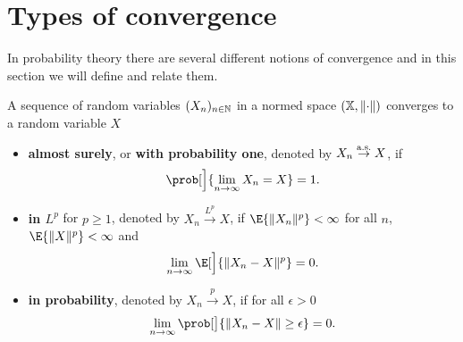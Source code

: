 \section{Types of convergence}

In probability theory there are several different notions of convergence and in
this section we will define and relate them.

\begin{mdframed}[innertopmargin=0pt]
\begin{definition}
    \label{def: types of convergence}
    A sequence of random variables \((X_n)_{n\in \mathbb{N}}\) in a normed
    space \((\mathbb{X}, \lVert\cdot\rVert)\) converges to a random variable \(X\)
    \begin{itemize}
        \item \textbf{almost surely}, or \textbf{with probability one}, denoted by \(X_n \overset{\operatorname{\text{a.s.}}}\to X\), if
        \[
            \prob[\Big]{\lim_{n \to \infty} X_n = X} = 1.
        \]

        \item \textbf{in \(L^p\)} for \(p \geq 1\), denoted by \(X_n \overset{L^p}\to X\), if \(\E{\norm{X_n}^p} < \infty\) for all \(n\), \(\E{\norm{X}^p} < \infty\)
        and
        \[
            \lim_{n \to \infty} \E[\Big]{\norm{X_n - X}^p} = 0.
        \]

        \item \textbf{in probability}, denoted by \(X_n \overset{p}\to X\), if for all \(\epsilon > 0\)
        \[
            \lim_{n \to \infty} \prob[\big]{\norm{X_n- X} \ge \epsilon} = 0.
        \]


\end{itemize}
\end{definition}
\end{mdframed}
